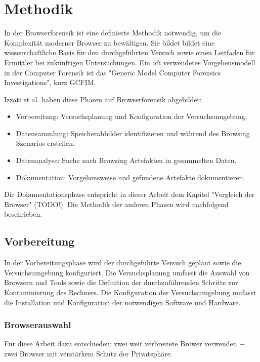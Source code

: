 \chapter{Methodik}
\label{chapter:methodik}
In der Browserforensik ist eine definierte Methodik notwendig, um die Komplexität moderner Browser zu bewältigen. Sie bildet bildet eine wissenschaftliche Basis für den durchgeführten Versuch sowie einen Leitfaden für Ermittler bei zukünftigen Untersuchungen. \cite{Aggarwal.2010, Izzati.2022, Horsman.2019}	
Ein oft verwendetes Vorgehensmodell in der Computer Forensik ist das "Generic Model Computer Forensics Investigations", kurz GCFIM. \cite{Yusoff.2011}

Izzati et al. haben diese Phasen auf Browserforensik abgebildet: \cite{Izzati.2022}
\begin{itemize}
	\item Vorbereitung: Versuchsplanung und Konfiguration der Versuchsumgebung.
	\item Datensammlung: Speicherabbilder identifizieren und während des Browsing Szenarios erstellen. 
	\item Datenanalyse: Suche nach Browsing Artefakten in gesammelten Daten.
	\item Dokumentation: Vorgehensweise und gefundene Artefakte dokumentieren.
\end{itemize}

Die Dokumentationsphase entspricht in dieser Arbeit dem Kapitel "Vergleich der Browser" (TODO!). Die Methodik der anderen Phasen wird nachfolgend beschrieben.

\section{Vorbereitung}
\label{section:methodik-vorbereitung}
In der Vorbereitungsphase wird der durchgeführte Versuch geplant sowie die Versuchsumgebung konfiguriert. \cite{Izzati.2022} Die Versuchsplanung umfasst die Auswahl von Browsern und Tools sowie die Definition der durchzuführenden Schritte zur Kontaminierung des Rechners. Die Konfiguration der Versuchsumgebung umfasst die Installation und Konfiguration der notwendigen Software und Hardware.

\subsection{Browserauswahl}
\label{section:methodik-vorbereitung-browserauswahl}
Für diese Arbeit dazu entschieden: zwei weit verbreitete Brower verwenden + zwei Browser mit verstärkem Schutz der Privatsphäre.


